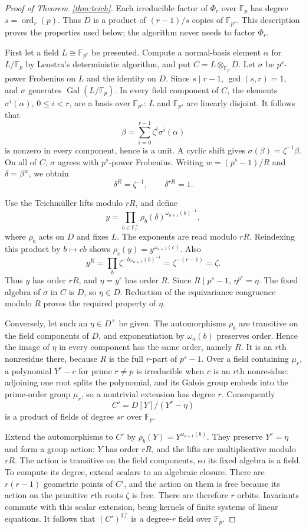 \documentclass[11pt]{article}
\newcommand{\F}{\mathbb F}
\newcommand{\ord}{\operatorname{ord}}
\newcommand{\Gal}{\operatorname{Gal}}
\theoremstyle{definition}
\theoremstyle{remark}
\begin{document}
\begin{proof}[Proof of Theorem~\ref{thm:teich}]
Each irreducible factor of $\Phi_r$ over $\F_p$ has degree
$s=\ord_r(p)$.  Thus $D$ is a product of $(r-1)/s$ copies
of $\F_{p^s}$.  This description proves the properties used
below; the algorithm never needs to factor $\Phi_r$.

First let a field $L\cong\F_{p^r}$ be presented.
Compute a normal-basis element $\alpha$ for $L/\F_p$ by
Lenstra's deterministic algorithm, and put $C=L\otimes_{\F_p}D$.
Let $\sigma$ be $p^s$-power Frobenius on $L$ and the identity
on $D$.  Since $s\mid r-1$, $\gcd(s,r)=1$, and $\sigma$
generates $\Gal(L/\F_p)$.  In every field component of $C$,
the elements $\sigma^i(\alpha)$, $0\le i<r$, are a basis over
$\F_{p^s}$: $L$ and $\F_{p^s}$ are linearly disjoint.
It follows that
\[
 \beta=\sum_{i=0}^{r-1}\zeta^i\sigma^i(\alpha)
\]
is nonzero in every component, hence is a unit.  A cyclic
shift gives $\sigma(\beta)=\zeta^{-1}\beta$.
On all of $C$, $\sigma$ agrees with $p^s$-power Frobenius.
Writing $w=(p^s-1)/R$ and $\delta=\beta^w$, we obtain
\[
 \delta^R=\zeta^{-1},\qquad \delta^{rR}=1.
\]

Use the Teichm\"uller lifts modulo $rR$, and define
\[
 y=\prod_{b\in\F_r^\times}
          \rho_b(\delta)^{\omega_{a+1}(b)^{-1}},
\]
where $\rho_b$ acts on $D$ and fixes $L$.
The exponents are read modulo $rR$.  Reindexing this product
by $b\mapsto cb$ shows $\rho_c(y)=y^{\omega_{a+1}(c)}$.
Also
\[
 y^R=\prod_b\zeta^{-b\omega_{a+1}(b)^{-1}}
     =\zeta^{-(r-1)}=\zeta.
\]
Thus $y$ has order $rR$, and $\eta=y^r$ has order $R$.
Since $R\mid p^s-1$, $\eta^{p^s}=\eta$.
The fixed algebra of $\sigma$ in $C$ is $D$, so $\eta\in D$.
Reduction of the equivariance congruence modulo $R$ proves
the required property of $\eta$.

Conversely, let such an $\eta\in D^\times$ be given.
The automorphisms $\rho_b$ are transitive on the field
components of $D$, and exponentiation by $\omega_a(b)$
preserves order.  Hence the image of $\eta$ in every component
has the same order, namely $R$.  It is an $r$th nonresidue
there, because $R$ is the full $r$-part of $p^s-1$.
Over a field containing $\mu_r$, a polynomial $Y^r-c$ for
prime $r\ne p$ is irreducible when $c$ is an $r$th nonresidue:
adjoining one root splits the polynomial, and its Galois group
embeds into the prime-order group $\mu_r$, so a nontrivial
extension has degree $r$.
Consequently
\[
 C'=D[Y]/(Y^r-\eta)
\]
is a product of fields of degree $sr$ over $\F_p$.

Extend the automorphisms to $C'$ by
$\rho_b(Y)=Y^{\omega_{a+1}(b)}$.
They preserve $Y^r=\eta$ and form a group action: $Y$ has
order $rR$, and the lifts are multiplicative modulo $rR$.
The action is transitive on the field components, so its
fixed algebra is a field.  To compute its degree, extend
scalars to an algebraic closure.  There are $r(r-1)$ geometric
points of $C'$, and the action on them is free because its
action on the primitive $r$th roots $\zeta$ is free.
There are therefore $r$ orbits.  Invariants commute with
this scalar extension, being kernels of finite systems of
linear equations.  It follows that $(C')^{\F_r^\times}$
is a degree-$r$ field over $\F_p$.


\end{proof}
\end{document}

